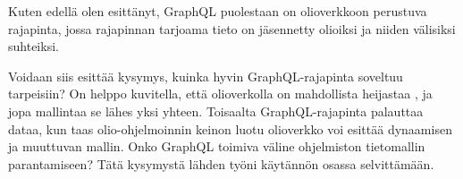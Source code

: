 Kuten edellä olen esittänyt, GraphQL puolestaan on olioverkkoon
perustuva rajapinta, jossa rajapinnan tarjoama tieto on jäsennetty
olioiksi ja niiden välisiksi suhteiksi.

Voidaan siis esittää kysymys, kuinka hyvin GraphQL-rajapinta soveltuu
 tarpeisiin? On helppo
kuvitella, että olioverkolla on mahdollista heijastaa
, ja jopa mallintaa se lähes yksi yhteen.
Toisaalta GraphQL-rajapinta palauttaa dataa, kun taas olio-ohjelmoinnin
keinon luotu olioverkko voi esittää dynaamisen ja muuttuvan mallin. Onko
GraphQL toimiva väline ohjelmiston tietomallin parantamiseen? Tätä
kysymystä lähden työni käytännön osassa selvittämään.
